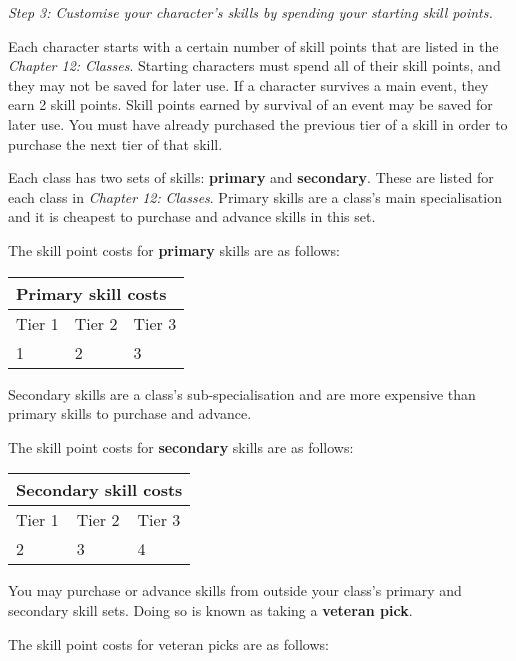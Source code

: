 \documentclass{scrbook}
\begin{document}
\textit{Step 3: Customise your character's skills by spending your starting skill points.}

Each character starts with a certain number of skill points that are listed in the \textit{Chapter 12: Classes}. Starting characters must spend all of their skill points, and they may not be saved for later use. If a character survives a main event, they earn 2 skill points. Skill points earned by survival of an event may be saved for later use. You must have already purchased the previous tier of a skill in order to purchase the next tier of that skill.

Each class has two sets of skills: \textbf{primary} and \textbf{secondary}. These are listed for each class in \textit{Chapter 12:} \textit{Classes}. Primary skills are a class's main specialisation and it is cheapest to purchase and advance skills in this set.

The skill point costs for \textbf{primary} skills are as follows:

\begin{table}
\begin{tabular}{|l|l|l|} \hline 
\multicolumn{3}{|l|}{Primary skill costs} \\
 \hline Tier 1 & Tier 2 & Tier 3 \\
 \hline 1 & 2 & 3 \\
 \hline \end{tabular}

\end{table}

Secondary skills are a class's sub-specialisation and are more expensive than primary skills to purchase and advance.

The skill point costs for \textbf{secondary} skills are as follows:

\begin{table}
\begin{tabular}{|l|l|l|} \hline 
\multicolumn{3}{|l|}{Secondary skill costs} \\
 \hline Tier 1 & Tier 2 & Tier 3 \\
 \hline 2 & 3 & 4 \\
 \hline \end{tabular}

\end{table}

You may purchase or advance skills from outside your class's primary and secondary skill sets. Doing so is known as taking a \textbf{veteran pick}.

The skill point costs for veteran picks are as follows:
\end{document}
